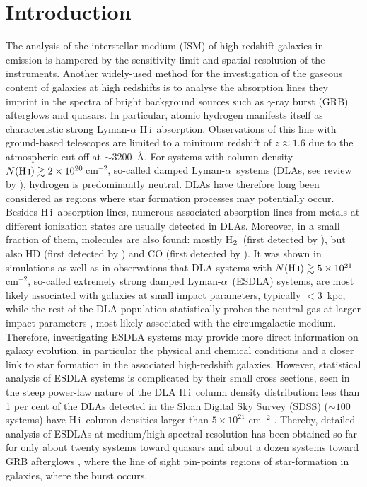 \documentclass[fleqn,usenatbib,useAMS]{mnras}
\newcommand{\HH}{\mbox{H$\rm _2$}}
\newcommand{\dla}{damped Lyman-$\alpha$}
\newcommand{\HI}{H\,{\sc i}}
\begin{document}
\section{Introduction}\label{sec:Introduction}
%
The analysis of the interstellar medium (ISM) of high-redshift galaxies in emission is hampered by the sensitivity limit and spatial resolution of the instruments.
Another widely-used method for the investigation of the gaseous content of galaxies at high redshifts is to analyse the absorption lines they imprint in the spectra of bright background sources such as $\gamma$-ray burst (GRB) afterglows and quasars. In particular, atomic hydrogen manifests itself as characteristic strong Lyman-$\alpha$ \HI\ absorption. Observations of this line with ground-based telescopes are limited to a minimum redshift of $z\approx1.6$ due to the atmospheric cut-off at $\sim$3200~\AA. For systems with column density $N(\text{\HI})\gtrsim2\times10^{20}$\,cm$^{-2}$, so-called  \dla\ systems (DLAs, see review by \citealt{Wolfe2005}), hydrogen is predominantly neutral. DLAs have therefore long been considered as regions where star formation processes may potentially occur. Besides \HI\ absorption lines, numerous associated absorption lines from metals at different ionization states are usually detected in DLAs. Moreover, in a small fraction of them, molecules are also found: mostly \HH\, (first detected by \citealt{Levshakov1985}), but also HD (first detected by \citealt{Varshalovich2001}) and CO (first detected by \citealt{Srianand2008}).
It was shown in simulations \citep[e.g.]{Rahmati2014} as well as in observations \citep{Noterdaeme2012b,Noterdaeme2014,Ranjan2018,Ranjan2020} that DLA systems with $N(\text{\HI})\gtrsim 5\times10^{21}$ cm$^{-2}$, so-called extremely strong \dla\ (ESDLA) systems, are most likely associated with galaxies at small impact parameters, typically $<3$~kpc, while the rest of the DLA population statistically probes the neutral gas at larger impact parameters \citep{Krogager2017}, most likely associated with the circumgalactic medium. Therefore, investigating ESDLA systems may provide more direct information on galaxy evolution, in  particular the physical and chemical conditions and a closer link to star formation in the associated high-redshift galaxies.
However, statistical analysis of ESDLA systems is complicated by their small cross sections, seen in the steep power-law nature of the DLA \HI\ column density distribution: less than 1 per cent of the DLAs detected in the Sloan Digital Sky Survey (SDSS) ($\sim 100$ systems) have \HI\ column densities larger than $5\times10^{21}$ cm$^{-2}$ \citep{Noterdaeme2014}. Thereby, detailed analysis of ESDLAs at medium/high spectral resolution has been obtained so far for only about twenty systems toward quasars \citep[e.g.][and references therein]{Ranjan2020} and about a dozen systems toward GRB afterglows \citep{Bolmer2019}, where 
the line of sight pin-points regions of star-formation in galaxies, where the burst occurs.
\end{document}

